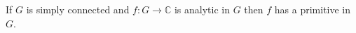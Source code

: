 If $G$ is simply connected and $f: G \rightarrow \mathbb{C}$ is analytic in $G$ then $f$ has a primitive in $G$.